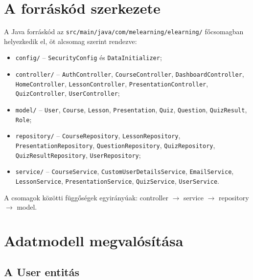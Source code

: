 \section{A forráskód szerkezete}

A Java forráskód az \texttt{src/main/java/com/melearning/elearning/} főcsomagban helyezkedik el, öt alcsomag szerint rendezve:

\begin{itemize}
    \item \texttt{config/} – \texttt{SecurityConfig} és \texttt{DataInitializer};
    \item \texttt{controller/} – \texttt{AuthController}, \texttt{CourseController}, \texttt{DashboardController}, \texttt{HomeController}, \texttt{LessonController}, \texttt{PresentationController}, \texttt{QuizController}, \texttt{UserController};
    \item \texttt{model/} – \texttt{User}, \texttt{Course}, \texttt{Lesson}, \texttt{Presentation}, \texttt{Quiz}, \texttt{Question}, \texttt{QuizResult}, \texttt{Role};
    \item \texttt{repository/} – \texttt{CourseRepository}, \texttt{LessonRepository}, \texttt{PresentationRepository}, \texttt{QuestionRepository}, \texttt{QuizRepository}, \texttt{QuizResultRepository}, \texttt{UserRepository};
    \item \texttt{service/} – \texttt{CourseService}, \texttt{CustomUserDetailsService}, \texttt{EmailService}, \texttt{LessonService}, \texttt{PresentationService}, \texttt{QuizService}, \texttt{UserService}.
\end{itemize}

A csomagok közötti függőségek egyirányúak: controller $\to$ service $\to$ repository $\to$ model. 

\section{Adatmodell megvalósítása}

\subsection{A User entitás}

